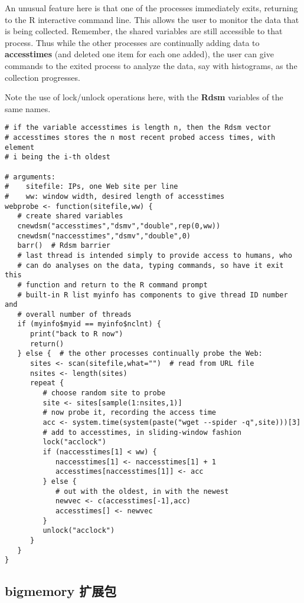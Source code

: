 An unusual feature here is that one of the processes immediately exits,
returning to the R interactive command line.  This allows the user to
monitor the data that is being collected.  Remember, the shared
variables are still accessible to that process.  Thus while the other
processes are continually adding data to {\bf accesstimes} (and deleted
one item for each one added), the user can give commands to the exited
process to analyze the data, say with histograms, as the collection
progresses.

Note the use of lock/unlock operations here, with the {\bf Rdsm}
variables of the same names.

\begin{lstlisting}
# if the variable accesstimes is length n, then the Rdsm vector
# accesstimes stores the n most recent probed access times, with element
# i being the i-th oldest

# arguments:
#    sitefile: IPs, one Web site per line
#    ww: window width, desired length of accesstimes
webprobe <- function(sitefile,ww) {
   # create shared variables
   cnewdsm("accesstimes","dsmv","double",rep(0,ww))
   cnewdsm("naccesstimes","dsmv","double",0)
   barr()  # Rdsm barrier
   # last thread is intended simply to provide access to humans, who
   # can do analyses on the data, typing commands, so have it exit this
   # function and return to the R command prompt
   # built-in R list myinfo has components to give thread ID number and
   # overall number of threads
   if (myinfo$myid == myinfo$nclnt) {
      print("back to R now")
      return()
   } else {  # the other processes continually probe the Web:
      sites <- scan(sitefile,what="")  # read from URL file
      nsites <- length(sites)
      repeat {
         # choose random site to probe
         site <- sites[sample(1:nsites,1)]
         # now probe it, recording the access time
         acc <- system.time(system(paste("wget --spider -q",site)))[3]
         # add to accesstimes, in sliding-window fashion
         lock("acclock")
         if (naccesstimes[1] < ww) {
            naccesstimes[1] <- naccesstimes[1] + 1
            accesstimes[naccesstimes[1]] <- acc
         } else {
            # out with the oldest, in with the newest
            newvec <- c(accesstimes[-1],acc)
            accesstimes[] <- newvec
         }
         unlock("acclock")
      }
   }
}
\end{lstlisting}

\subsection{bigmemory 扩展包}
\label{bigmemory}

